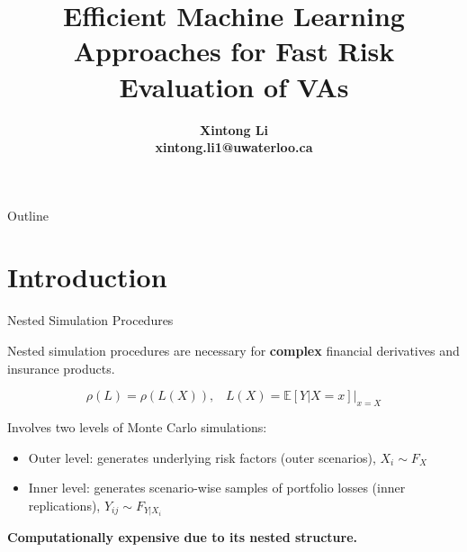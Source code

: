 \documentclass[9pt,handout]{beamer}
\title[\textbf{Resilient Machine Learning Approaches for Fast Risk Evaluation and Management in Financial Portfolios and Variable Annuities}]{Efficient Machine Learning Approaches for Fast Risk Evaluation of VAs}
\author[\textbf{Xintong Li, xintong.li1@uwaterloo.ca}]
{\Large\bfseries
Xintong Li\\\medskip
xintong.li1@uwaterloo.ca
} %
\institute[\textbf{University of Waterloo, Actuarial Science}] %
{\large\bfseries
Dept. Statistics and Actuarial Science\\\smallskip
University of Waterloo %
}
\begin{document}
{
\beamertemplatenavigationsymbolsempty
\begin{frame}[plain]
\titlepage
\end{frame}
}

{
\beamertemplatenavigationsymbolsempty
{}
{ }
\begin{frame}{Outline}
\tableofcontents
\end{frame}
}
\addtocounter{framenumber}{-2}

\section{Introduction}

\begin{frame}{Nested Simulation Procedures}

Nested simulation procedures are necessary for \textbf{complex} financial derivatives and insurance products.

$$\rho(L) = \rho(L(X)), \;\;\; L(X) = \mathbb{E}\left[ Y|X=x \right]\vert_{x=X}  $$

Involves two levels of Monte Carlo simulations:
\begin{itemize}
    \item Outer level: generates underlying risk factors (outer scenarios), $X_i \sim F_X$
    \item Inner level: generates scenario-wise samples of portfolio losses (inner replications), $Y_{ij} \sim F_{Y|X_i}$
\end{itemize}

\textbf{Computationally expensive due to its nested structure.}

\end{frame}
\end{document}
